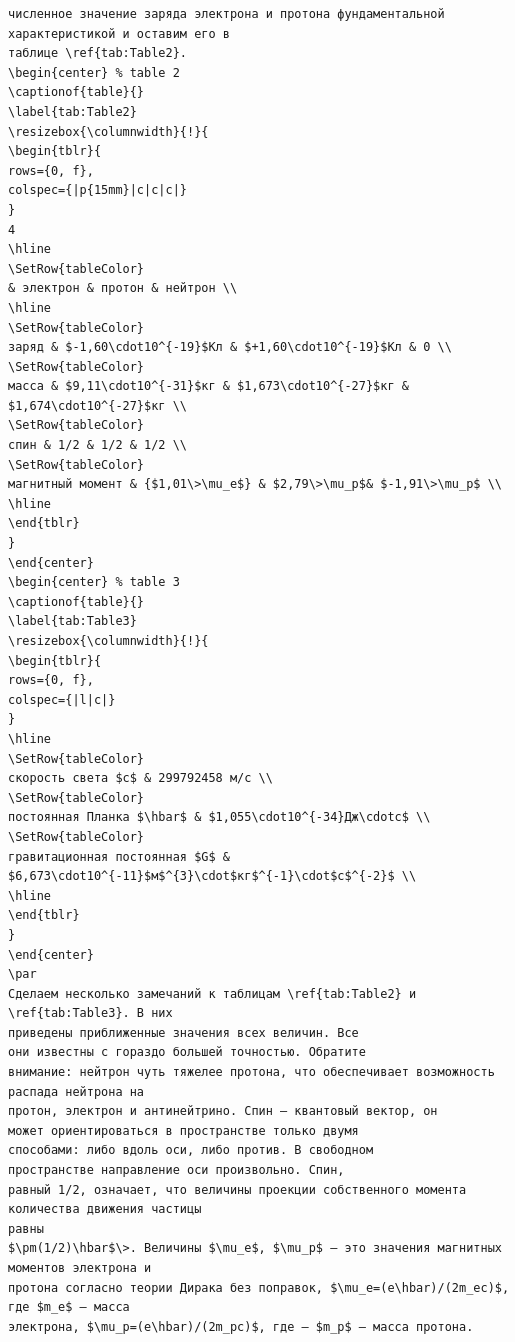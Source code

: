 \documentclass[a4paper,10pt]{article}
\begin{document}
\begin{verbatim}
численное значение заряда электрона и протона фундаментальной характеристикой и оставим его в
таблице \ref{tab:Table2}.
\begin{center} % table 2
\captionof{table}{}
\label{tab:Table2}
\resizebox{\columnwidth}{!}{
\begin{tblr}{
rows={0, f},
colspec={|p{15mm}|c|c|c|}
}
4
\hline
\SetRow{tableColor}
& электрон & протон & нейтрон \\
\hline
\SetRow{tableColor}
заряд & $-1,60\cdot10^{-19}$Кл & $+1,60\cdot10^{-19}$Кл & 0 \\
\SetRow{tableColor}
масса & $9,11\cdot10^{-31}$кг & $1,673\cdot10^{-27}$кг & $1,674\cdot10^{-27}$кг \\
\SetRow{tableColor}
спин & 1/2 & 1/2 & 1/2 \\
\SetRow{tableColor}
магнитный момент & {$1,01\>\mu_e$} & $2,79\>\mu_p$& $-1,91\>\mu_p$ \\
\hline
\end{tblr}
}
\end{center}
\begin{center} % table 3
\captionof{table}{}
\label{tab:Table3}
\resizebox{\columnwidth}{!}{
\begin{tblr}{
rows={0, f},
colspec={|l|c|}
}
\hline
\SetRow{tableColor}
скорость света $c$ & 299792458 м/c \\
\SetRow{tableColor}
постоянная Планка $\hbar$ & $1,055\cdot10^{-34}Дж\cdotс$ \\
\SetRow{tableColor}
гравитационная постоянная $G$ & $6,673\cdot10^{-11}$м$^{3}\cdot$кг$^{-1}\cdot$с$^{-2}$ \\
\hline
\end{tblr}
}
\end{center}
\par
Сделаем несколько замечаний к таблицам \ref{tab:Table2} и \ref{tab:Table3}. В них
приведены приближенные значения всех величин. Все
они известны с гораздо большей точностью. Обратите
внимание: нейтрон чуть тяжелее протона, что обеспечивает возможность распада нейтрона на
протон, электрон и антинейтрино. Спин – квантовый вектор, он
может ориентироваться в пространстве только двумя
способами: либо вдоль оси, либо против. В свободном
пространстве направление оси произвольно. Спин,
равный 1/2, означает, что величины проекции собственного момента количества движения частицы
равны
$\pm(1/2)\hbar$\>. Величины $\mu_e$, $\mu_p$ – это значения магнитных моментов электрона и
протона согласно теории Дирака без поправок, $\mu_e=(e\hbar)/(2m_ec)$, где $m_e$ – масса
электрона, $\mu_p=(e\hbar)/(2m_pc)$, где – $m_p$ – масса протона.

\end{verbatim}
\end{document}
